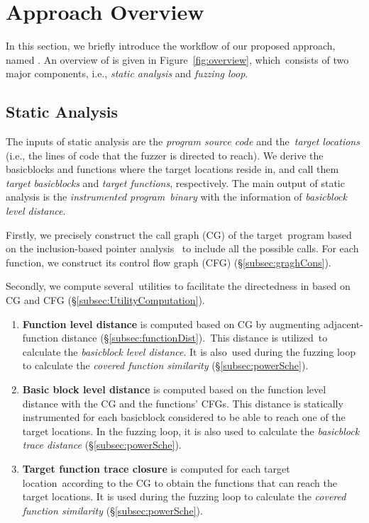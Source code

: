 \section{Approach Overview}

In this section, we briefly introduce the workflow of our proposed approach, named \dFOT. An overview of \dFOT is given in Figure~\ref{fig:overview}, which~consists of two major components, i.e., \textit{static analysis} and \textit{fuzzing loop}. 



\subsection{Static Analysis}\label{subsec:static_flow}

The inputs of static analysis are the \textit{program source code} and the~\textit{target locations} (i.e., the lines of code that the fuzzer is directed to reach). We derive the basicblocks and functions where the target locations reside in, and call them \textit{target basicblocks} and \textit{target functions}, respectively. The main output of static analysis is the \textit{instrumented program~binary} with the information of \textit{basicblock level distance}.

Firstly, we precisely construct the call graph (CG) of the target~program based on the inclusion-based pointer analysis~\cite{Andersen94programanalysis} to include all the possible calls. For each function, we construct its  control flow graph (CFG) (\S\ref{subsec:graghCons}).

Secondly, we compute several~utilities to facilitate the directedness in \dFOT based on CG and CFG (\S\ref{subsec:UtilityComputation}).
\begin{enumerate}[(1)]
\item \textbf{Function level distance} is computed based on CG by augmenting adjacent-function distance (\S\ref{subsec:functionDist}).~This distance is utilized~to calculate the \textit{basicblock level distance}. It is also~used during the fuzzing loop to calculate the \emph{covered function similarity} (\S\ref{subsec:powerSche}).
    
\item \textbf{Basic block level distance} is computed based on the function level distance with the CG and the functions' CFGs. This distance is statically instrumented for each basicblock considered to be able to reach one of the target locations. In the fuzzing loop, it is also used to calculate the \emph{basicblock trace distance} (\S\ref{subsec:powerSche}).

\item \textbf{Target function trace closure} is computed for each target location~according to the CG to obtain the functions that can reach the target locations. It is used during the fuzzing loop to calculate the \emph{covered function similarity} (\S\ref{subsec:powerSche}).
\end{enumerate}

